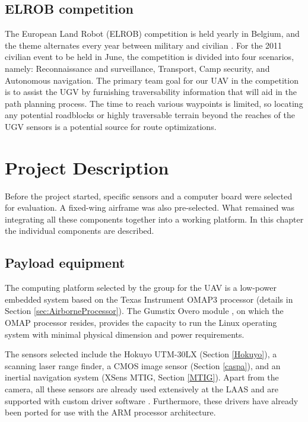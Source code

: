 \documentclass[a4paper,11pt]{report}
\begin{document}
\section{ELROB competition}

The European Land Robot (ELROB) competition is held yearly in Belgium, and the theme alternates every year between military and civilian \cite{elrob}. For the 2011 civilian event to be held in June, the competition is divided into four scenarios, namely: Reconnaissance and surveillance, Transport, Camp security, and Autonomous navigation. The primary team goal for our UAV in the competition is to assist the UGV by furnishing traversability information that will aid in the path planning process. The time to reach various waypoints is limited, so locating any potential roadblocks or highly traversable terrain beyond the reaches of the UGV sensors is a potential source for route optimizations.

\chapter{Project Description}

Before the project started, specific sensors and a computer board were selected for evaluation. A fixed-wing airframe was also pre-selected. What remained was integrating all these components together into a working platform. In this chapter the individual components are described.

\section{Payload equipment}

The computing platform selected by the group for the UAV is a low-power embedded system based on the Texas Instrument OMAP3 processor (details in Section \ref{sec:AirborneProcessor}). The Gumstix Overo module \cite{Overo}, on which the OMAP processor resides, provides the capacity to run the Linux operating system with minimal physical dimension and power requirements. 

The sensors selected include the Hokuyo UTM-30LX (Section \ref{Hokuyo}), a scanning laser range finder, a CMOS image sensor (Section \ref{caspa}), and an inertial navigation system (XSens MTIG, Section \ref{MTIG}). Apart from the camera, all these sensors are already used extensively at the LAAS and are supported with custom driver software \cite{robotpkg}. Furthermore, these drivers have already been ported for use with the ARM processor architecture.
\end{document}
